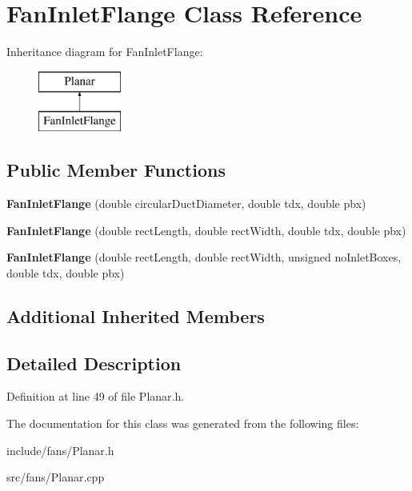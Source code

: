 \hypertarget{class_fan_inlet_flange}{}\section{Fan\+Inlet\+Flange Class Reference}
\label{class_fan_inlet_flange}
Inheritance diagram for Fan\+Inlet\+Flange\+:\begin{figure}[H]
\begin{center}
\leavevmode
\includegraphics[height=2.000000cm]{d3/dca/class_fan_inlet_flange}
\end{center}
\end{figure}
\subsection*{Public Member Functions}
\begin{DoxyCompactItemize}
\item 
\mbox{\label{class_fan_inlet_flange_a56cdb0d5f1095a700a5aca9a3e938d54}} 
{\bfseries Fan\+Inlet\+Flange} (double circular\+Duct\+Diameter, double tdx, double pbx)
\item 
\mbox{\label{class_fan_inlet_flange_a1e584188ed5169268520c6a7d2e3fbf6}} 
{\bfseries Fan\+Inlet\+Flange} (double rect\+Length, double rect\+Width, double tdx, double pbx)
\item 
\mbox{\label{class_fan_inlet_flange_a40be4c42d0fa2670d90c1b24703346bd}} 
{\bfseries Fan\+Inlet\+Flange} (double rect\+Length, double rect\+Width, unsigned no\+Inlet\+Boxes, double tdx, double pbx)
\end{DoxyCompactItemize}
\subsection*{Additional Inherited Members}


\subsection{Detailed Description}


Definition at line 49 of file Planar.\+h.



The documentation for this class was generated from the following files\+:\begin{DoxyCompactItemize}
\item 
include/fans/Planar.\+h\item 
src/fans/Planar.\+cpp\end{DoxyCompactItemize}

